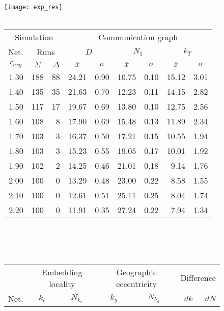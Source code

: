 \documentclass{article}
\begin{document}
\begin{figure}[h]
\begin{center}
\texttt{[image: exp\_res]}
~\\~\\
\begin{tabular}{|r|rr|rr|rr|rr|}
\hline
\multicolumn{3}{|c|}{Simulation} & \multicolumn{6}{|c|}{Communication graph}\\
\multicolumn{1}{|c}{Net.} & \multicolumn{2}{c|}{Runs} & \multicolumn{2}{|c}{$D$} & \multicolumn{2}{c}{$N_1$} & \multicolumn{2}{c|}{$k_T$}\\
\hline
\multicolumn{1}{|c|}{$r_{avg}$} & \multicolumn{1}{|c}{$\Sigma$} & \multicolumn{1}{c|}{$\Delta$} & \multicolumn{1}{|c}{$\overline{x}$} & \multicolumn{1}{c|}{$\sigma$} & \multicolumn{1}{|c}{$\overline{x}$} & \multicolumn{1}{c|}{$\sigma$} & \multicolumn{1}{|c}{$\overline{x}$} & \multicolumn{1}{c|}{$\sigma$}\\
1.30 & 188 & 88 & 24.21 & 0.90 & 10.75 & 0.10 & 15.12 & 3.01\\
1.40 & 135 & 35 & 21.63 & 0.70 & 12.23 & 0.11 & 14.15 & 2.82\\
1.50 & 117 & 17 & 19.67 & 0.69 & 13.80 & 0.10 & 12.75 & 2.56\\
1.60 & 108 &  8 & 17.90 & 0.69 & 15.48 & 0.13 & 11.89 & 2.34\\
1.70 & 103 &  3 & 16.37 & 0.50 & 17.21 & 0.15 & 10.55 & 1.94\\
1.80 & 103 &  3 & 15.23 & 0.55 & 19.05 & 0.17 & 10.01 & 1.92\\
1.90 & 102 &  2 & 14.25 & 0.46 & 21.01 & 0.18 &  9.14 & 1.76\\
2.00 & 100 &  0 & 13.29 & 0.48 & 23.00 & 0.22 &  8.58 & 1.55\\
2.10 & 100 &  0 & 12.61 & 0.51 & 25.11 & 0.25 &  8.04 & 1.74\\ 
2.20 & 100 &  0 & 11.91 & 0.35 & 27.24 & 0.22 &  7.94 & 1.34\\
\hline
\end{tabular}\\
~\\~\\
\begin{tabular}{|r|rr|rr|rr|rr|rr|}
\hline
& \multicolumn{4}{|c|}{Embedding locality} & \multicolumn{4}{|c|}{Geographic eccentricity} & \multicolumn{2}{|c|}{Difference}\\
Net. & \multicolumn{2}{c}{$k_e$} & \multicolumn{2}{c|}{$N_{k_e}$} & \multicolumn{2}{c}{$k_g$} & \multicolumn{2}{c|}{$N_{k_g}$}& $dk$ & $dN$\\

\end{tabular}
\end{center}
\end{figure}
\end{document}
